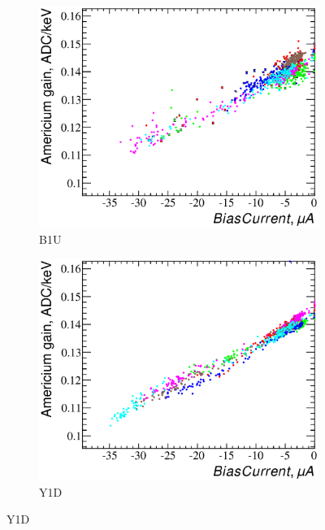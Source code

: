 \documentclass[a4paper,12pt]{article}
\begin{document}
\newcommand\bcvsgainlabel{Bias current versus americium gain ($\mu_{\text{Am}} /
E_{\text{Am}}$) dependency. The colors represent different detectors.}
\begin{figure}
\begin{subfigure}[b]{0.5\textwidth}
\includegraphics[width=\textwidth]{gfx/run13_alpha_study_novoltagevariation/B1U/c_hBiasCurrent_AmGain.eps}
\caption{B1U}\label{bc_vs_gain-b1u}
\end{subfigure}
\begin{subfigure}[b]{0.5\textwidth}
\includegraphics[width=\textwidth]{gfx/run13_alpha_study_novoltagevariation/Y1D/c_hBiasCurrent_AmGain.eps}
\caption{Y1D}\label{bc_vs_gain-y1d}
\end{subfigure}


\end{figure}
\end{document}
